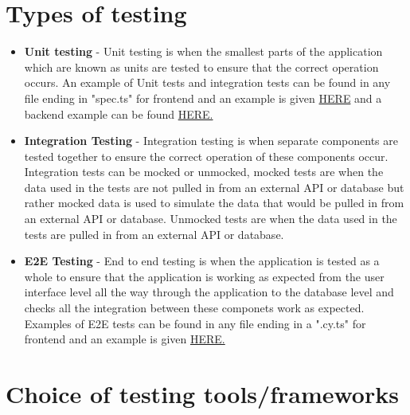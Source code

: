 \documentclass[12pt]{article}
\begin{document}
\section{Types of testing}
\begin{itemize}
    \item \textbf{Unit testing} - Unit testing is when the smallest parts of the application which are known as units are tested to ensure that the correct operation occurs. An example of Unit tests and integration tests can be found in any file ending in "spec.ts" for frontend and an example is given \href {https://github.com/COS301-SE-2023/Domain-Pulse-A-Sentiment-Analysis-Platform/blob/dev/frontend/src/app/main/main.component.spec.ts}{HERE} and a backend example can be found \href {https://github.com/COS301-SE-2023/Domain-Pulse-A-Sentiment-Analysis-Platform/blob/main/backend/engine/analyser/tests.py}{HERE.}
    \item \textbf{Integration Testing} - Integration testing is when separate components are tested together to ensure the correct operation of these components occur. Integration tests can be mocked or unmocked, mocked tests are when the data used in the tests are not pulled in from an external API or database but rather mocked data is used to simulate the data that would be pulled in from an external API or database. Unmocked tests are when the data used in the tests are pulled in from an external API or database.
    \item \textbf{E2E Testing} - End to end testing is when the application is tested as a whole to ensure that the application is working as expected from the user interface level all the way through the application to the database level and checks all the integration between these componets work as expected. Examples of E2E tests can be found in any file ending in a ".cy.ts" for frontend and an example is given \href {https://github.com/COS301-SE-2023/Domain-Pulse-A-Sentiment-Analysis-Platform/blob/main/frontend/cypress/e2e/accountsManage.cy.ts}{HERE.}
\end{itemize}
\newpage
\section{Choice of testing tools/frameworks}
\end{document}
